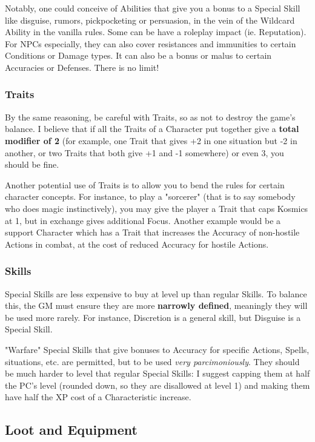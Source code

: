 Notably, one could conceive of Abilities that give you a bonus to a Special Skill like disguise, rumors, pickpocketing or persuasion, in the vein of the Wildcard Ability in the vanilla rules. Some can be have a roleplay impact (ie. Reputation). For NPCs especially, they can also cover resistances and immunities to certain Conditions or Damage types. It can also be a bonus or malus to certain Accuracies or Defenses. There is no limit!

\subsubsection{Traits}

By the same reasoning, be careful with Traits, so as not to destroy the game's balance. I believe that if all the Traits of a Character put together give a \textbf{total modifier of 2} (for example, one Trait that gives +2 in one situation but -2 in another, or two Traits that both give +1 and -1 somewhere) or even 3, you should be fine. 

Another potential use of Traits is to allow you to bend the rules for certain character concepts. For instance, to play a "sorcerer" (that is to say somebody who does magic instinctively), you may give the player a Trait that caps Kosmics at 1, but in exchange gives additional Focus. Another example would be a support Character which has a Trait that increases the Accuracy of non-hostile Actions in combat, at the cost of reduced Accuracy for hostile Actions.


\subsubsection{Skills}
\label{balancing_skills}

Special Skills are less expensive to buy at level up than regular Skills. To balance this, the GM must ensure they are more \textbf{narrowly defined}, meaningly they will be used more rarely. For instance, Discretion is a general skill, but Disguise is a Special Skill.

"Warfare" Special Skills that give bonuses to Accuracy for specific Actions, Spells, situations, etc. are permitted, but to be used \textit{very parcimoniously}. They should be much harder to level that regular Special Skills: I suggest capping them at half the PC's level (rounded down, so they are disallowed at level 1) and making them have half the XP cost of a Characteristic increase.

\subsection{Loot and Equipment}

